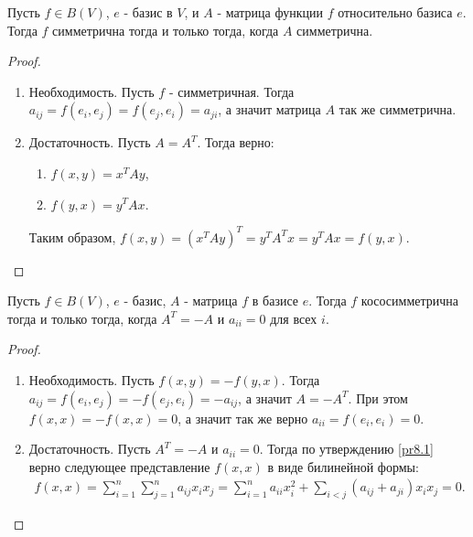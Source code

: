 \begin{proposition}
    Пусть $f \in B(V)$, $e$ - базис в $V$, и $A$ - матрица функции $f$ относительно базиса $e$. 
    Тогда $f$ симметрична тогда и только тогда, когда $A$ симметрична.
\end{proposition}

\begin{proof}~
    \begin{enumerate}
        \item Необходимость. Пусть $f$ - симметричная. 
        Тогда $a_{ij} = f(e_i, e_j) = f(e_j, e_i) = a_{ji}$, а значит матрица $A$ так же симметрична.
        \item Достаточность. Пусть $A = A^T$. Тогда верно:
        \begin{enumerate}
            \item $f(x, y) = x^T A y$, 
            \item $f(y, x) = y^T A x$. 
        \end{enumerate} 
        Таким образом, $f(x, y) = (x^T A y)^T = y^T A^T x = y^T A x = f(y, x)$.
    \end{enumerate}
\end{proof}

\begin{proposition}
    \label{pr9.3}
    Пусть $f \in B(V)$, $e$ - базис, $A$ - матрица $f$ в базисе $e$. 
    Тогда $f$ кососимметрична тогда и только 
    тогда, когда $A^T = -A$ и $a_{ii} = 0$ для всех $i$.
\end{proposition}

\begin{proof}~
    \begin{enumerate}
        \item Необходимость. Пусть $f(x, y) = - f(y, x)$. Тогда 
        $a_{ij} = f(e_i, e_j) = - f(e_j, e_i) = -a_{ij}$, а значит $A = - A^T$. 
        При этом $f(x, x) = - f(x, x) = 0$, а значит так же верно $a_{ii} = f(e_i, e_i) = 0$. 
        \item Достаточность. Пусть $A^T = - A$ и $a_{ii} = 0$. Тогда по утверждению \ref{pr8.1} 
        верно следующее представление $f(x, x)$ в виде билинейной формы:
        \begin{gather*}
            f(x, x) = \sum_{i=1}^{n} \sum_{j=1}^{n} a_{ij} x_i x_j = \sum_{i=1}^{n} a_{ii} x_i^2 + 
            \sum_{i < j} (a_{ij} + a_{ji}) x_i x_j = 0.
        \end{gather*}
    \end{enumerate}
\end{proof}

